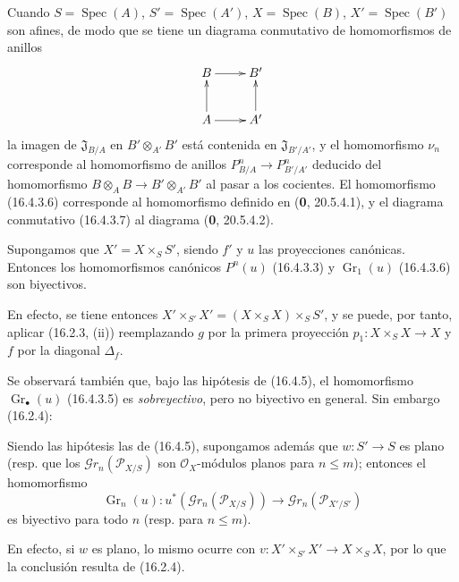 \begin{env}[16.4.4]
\label{IV.16.4.4}
Cuando $S=\operatorname{Spec}(A)$, $S'=\operatorname{Spec}(A')$,
$X=\operatorname{Spec}(B)$, $X'=\operatorname{Spec}(B')$ son afines, de modo
que se tiene un diagrama conmutativo de homomorfismos de anillos
\[
  \xymatrix{
    B \ar[r] & B' \\
    A \ar[u] \ar[r] & A' \ar[u]
  }
\]
la imagen de $\mathfrak{J}_{B/A}$ en $B'\otimes_{A'}B'$ está contenida en
$\mathfrak{J}_{B'/A'}$, y el homomorfismo $\nu_n$ corresponde al
homomorfismo de anillos $P_{B/A}^n\to P_{B'/A'}^n$ deducido del homomorfismo
$B\otimes_A B\to B'\otimes_{A'}B'$ al pasar a los cocientes. El homomorfismo
(16.4.3.6) corresponde al homomorfismo definido en (\textbf 0, 20.5.4.1), y el
diagrama conmutativo (16.4.3.7) al diagrama (\textbf 0, 20.5.4.2).
\end{env}

\begin{proposition}[16.4.5]
\label{IV.16.4.5}
Supongamos que $X'=X\times_S S'$, siendo $f'$ y $u$ las proyecciones canónicas.
Entonces los homomorfismos canónicos $P^n(u)$ \textup{(16.4.3.3)} y
$\operatorname{Gr}_1(u)$ \textup{(16.4.3.6)} son biyectivos.
\end{proposition}

En efecto, se tiene entonces $X'\times_{S'}X'=(X\times_S X)\times_S S'$, y se puede, por tanto,
aplicar (16.2.3, (ii)) reemplazando $g$ por la primera proyección
$p_1:X\times_S X\to X$ y $f$ por la diagonal $\Delta_f$.

Se observará también que, bajo las hipótesis de (16.4.5), el homomorfismo
$\operatorname{Gr}_\bullet(u)$ (16.4.3.5) es \emph{sobreyectivo}, pero no biyectivo en
general. Sin embargo (16.2.4):

\begin{corollary}[16.4.6]
\label{IV.16.4.6}
Siendo las hipótesis las de \textup{(16.4.5)}, supongamos además que $w:S'\to S$ es
plano \textup{(resp.} que los $\mathscr{G}r_n(\mathscr{P}_{X/S})$ son
$\mathcal{O}_X$-módulos planos para $n\leq m$); entonces el homomorfismo
\[
  \operatorname{Gr}_n(u):u^*(\mathscr{G}r_n(\mathscr{P}_{X/S}))
  \longrightarrow\mathscr{G}r_n(\mathscr{P}_{X'/S'})
\]
es biyectivo para todo $n$ \textup{(resp.} para $n\leq m$).
\end{corollary}

En efecto, si $w$ es plano, lo mismo ocurre con
$v:X'\times_{S'}X'\to X\times_S X$, por lo que la conclusión resulta de (16.2.4).

